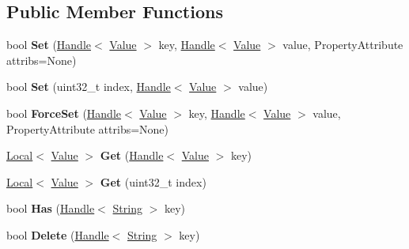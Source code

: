 \subsection*{Public Member Functions}
\begin{DoxyCompactItemize}
\item 
\hypertarget{classv8_1_1_object_a208583edae8e8da2c083879429ee3184}{}bool {\bfseries Set} (\hyperlink{classv8_1_1_handle}{Handle}$<$ \hyperlink{classv8_1_1_value}{Value} $>$ key, \hyperlink{classv8_1_1_handle}{Handle}$<$ \hyperlink{classv8_1_1_value}{Value} $>$ value, Property\+Attribute attribs=None)\label{classv8_1_1_object_a208583edae8e8da2c083879429ee3184}

\item 
\hypertarget{classv8_1_1_object_a5779059211f275447f433e7f8a859dd0}{}bool {\bfseries Set} (uint32\+\_\+t index, \hyperlink{classv8_1_1_handle}{Handle}$<$ \hyperlink{classv8_1_1_value}{Value} $>$ value)\label{classv8_1_1_object_a5779059211f275447f433e7f8a859dd0}

\item 
\hypertarget{classv8_1_1_object_aa89f3dce24a3a3431295218d24498c52}{}bool {\bfseries Force\+Set} (\hyperlink{classv8_1_1_handle}{Handle}$<$ \hyperlink{classv8_1_1_value}{Value} $>$ key, \hyperlink{classv8_1_1_handle}{Handle}$<$ \hyperlink{classv8_1_1_value}{Value} $>$ value, Property\+Attribute attribs=None)\label{classv8_1_1_object_aa89f3dce24a3a3431295218d24498c52}

\item 
\hypertarget{classv8_1_1_object_a976f0329ff7465c124652d633d469c06}{}\hyperlink{classv8_1_1_local}{Local}$<$ \hyperlink{classv8_1_1_value}{Value} $>$ {\bfseries Get} (\hyperlink{classv8_1_1_handle}{Handle}$<$ \hyperlink{classv8_1_1_value}{Value} $>$ key)\label{classv8_1_1_object_a976f0329ff7465c124652d633d469c06}

\item 
\hypertarget{classv8_1_1_object_aa494683803b31bcedab121929f4b0b17}{}\hyperlink{classv8_1_1_local}{Local}$<$ \hyperlink{classv8_1_1_value}{Value} $>$ {\bfseries Get} (uint32\+\_\+t index)\label{classv8_1_1_object_aa494683803b31bcedab121929f4b0b17}

\item 
\hypertarget{classv8_1_1_object_a5ae86b3538e5afbca528a0e3bdd896cc}{}bool {\bfseries Has} (\hyperlink{classv8_1_1_handle}{Handle}$<$ \hyperlink{classv8_1_1_string}{String} $>$ key)\label{classv8_1_1_object_a5ae86b3538e5afbca528a0e3bdd896cc}

\item 
\hypertarget{classv8_1_1_object_a51d85c48448af7812f60c1ca75111dd8}{}bool {\bfseries Delete} (\hyperlink{classv8_1_1_handle}{Handle}$<$ \hyperlink{classv8_1_1_string}{String} $>$ key)\label{classv8_1_1_object_a51d85c48448af7812f60c1ca75111dd8}


\end{DoxyCompactItemize}
